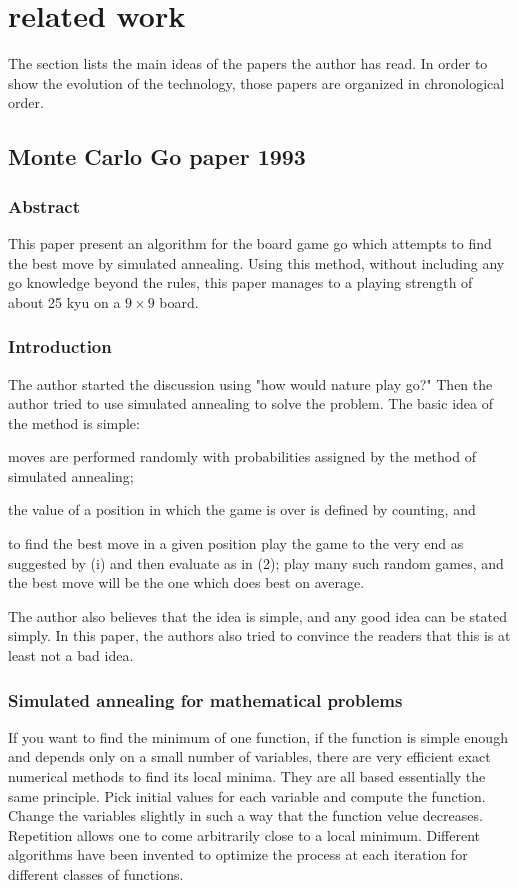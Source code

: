 \section{related work}
The section lists the main ideas of the papers the author has read. In order to show the evolution of the technology, those papers are organized in chronological order.
\subsection{Monte Carlo Go paper 1993~\cite{brugmann1993monte, silver2009monte, browne2012survey}}
\subsubsection{Abstract}
This paper present an algorithm for the board game go which attempts to find the best move by simulated 
annealing. Using this method, without including any go knowledge beyond the rules, this paper manages
to a playing strength of about 25 kyu on a $9\times9$ board.
\subsubsection{Introduction}
The author started the discussion using "how would nature play go?" Then the author tried to use simulated 
annealing to solve the problem. The basic idea of the method is simple: 
\begin{inparaenum}
	\item moves are performed randomly with probabilities assigned by the method of simulated annealing;
	\item the value of a position in which the game is over is defined by counting, and 
	\item to find the best move in a given position play the game to the very end as suggested by (i) 
		and then evaluate as in (2); play many such random games, and the best move will be the one which does best on average.
\end{inparaenum}
The author also believes that the idea is simple, and any good idea can be stated simply. In this paper, the authors also tried to convince the readers that this is at least not a bad idea.
\subsubsection{Simulated annealing for mathematical problems}
If you want to find the minimum of one function, if the function is simple enough and depends only on a small number of variables, there are very efficient exact numerical methods to find its local minima. They are all based essentially the same principle. Pick initial values for each variable and compute the function. Change the variables slightly in such a way that the function velue decreases. Repetition allows one to come arbitrarily close to a local minimum. Different algorithms have been invented to optimize the process at each iteration for different classes of functions.

